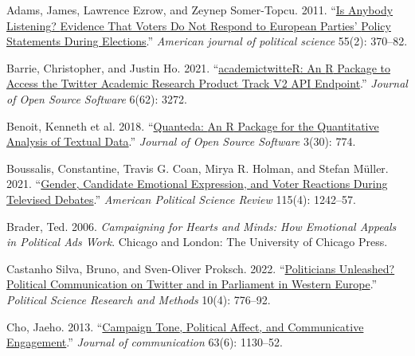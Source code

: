 \documentclass[a4paper,11pt]{article}
\newlength{\cslhangindent}
\newenvironment{CSLReferences}[2] %
 {\setlength{\cslhangindent}{#2\parindent}%
  \setlength{\parindent}{0pt}%
  \everypar{\setlength{\hangindent}{\cslhangindent}}\ignorespaces}
 {\par}
\begin{document}
\hypertarget{refs}{}
\begin{CSLReferences}{1}{0}
\leavevmode{}%
Adams, James, Lawrence Ezrow, and Zeynep Somer-Topcu. 2011. {``\href{https://doi.org/10.1111/j.1540-5907.2010.00489.x}{Is {Anybody Listening}? {Evidence That Voters Do Not Respond} to {European Parties}' {Policy Statements During Elections}}.''} \emph{American journal of political science} 55(2): 370--82.

\leavevmode{}%
Barrie, Christopher, and Justin Ho. 2021. {``\href{https://doi.org/10.21105/joss.03272}{{academictwitteR}: An {R} Package to Access the {Twitter Academic Research Product Track} V2 {API} Endpoint}.''} \emph{Journal of Open Source Software} 6(62): 3272.

\leavevmode{}%
Benoit, Kenneth et al. 2018. {``\href{https://doi.org/10.21105/joss.00774}{Quanteda: {An R} Package for the Quantitative Analysis of Textual Data}.''} \emph{Journal of Open Source Software} 3(30): 774.

\leavevmode{}%
Boussalis, Constantine, Travis G. Coan, Mirya R. Holman, and Stefan Müller. 2021. {``\href{https://doi.org/10.1017/S0003055421000666}{Gender, {Candidate Emotional Expression}, and {Voter Reactions During Televised Debates}}.''} \emph{American Political Science Review} 115(4): 1242--57.

\leavevmode{}%
Brader, Ted. 2006. \emph{Campaigning for Hearts and Minds: {How} Emotional Appeals in Political Ads Work}. {Chicago and London}: {The University of Chicago Press}.

\leavevmode{}%
Castanho Silva, Bruno, and Sven-Oliver Proksch. 2022. {``\href{https://doi.org/10.1017/psrm.2021.36}{Politicians Unleashed? {Political} Communication on {Twitter} and in Parliament in {Western Europe}}.''} \emph{Political Science Research and Methods} 10(4): 776--92.

\leavevmode{}%
Cho, Jaeho. 2013. {``\href{https://doi.org/10.1111/jcom.12064}{Campaign {Tone}, {Political Affect}, and {Communicative Engagement}}.''} \emph{Journal of communication} 63(6): 1130--52.


\end{CSLReferences}
\end{document}
